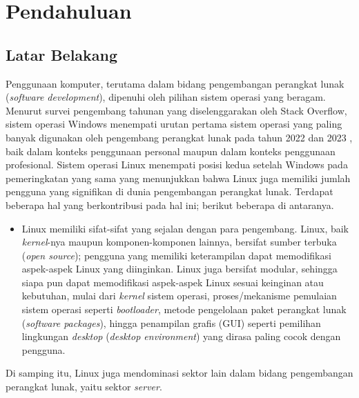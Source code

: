 \chapter{Pendahuluan}

\section{Latar Belakang}

Penggunaan komputer, terutama dalam bidang pengembangan perangkat lunak (\textit{software development}), dipenuhi oleh pilihan sistem operasi yang beragam. Menurut survei pengembang tahunan yang diselenggarakan oleh Stack Overflow, sistem operasi Windows menempati urutan pertama sistem operasi yang paling banyak digunakan oleh pengembang perangkat lunak pada tahun 2022 \cite{stackoverflow-developer-survey-2022-most-popular-os} dan 2023 \cite{stackoverflow-developer-survey-2023-most-popular-os}, baik dalam konteks penggunaan personal maupun dalam konteks penggunaan profesional. Sistem operasi Linux menempati posisi kedua setelah Windows pada pemeringkatan yang sama yang menunjukkan bahwa Linux juga memiliki jumlah pengguna yang signifikan di dunia pengembangan perangkat lunak. Terdapat beberapa hal yang berkontribusi pada hal ini; berikut beberapa di antaranya.
\begin{itemize}
    \item Linux memiliki sifat-sifat yang sejalan dengan para pengembang. Linux, baik \textit{kernel}-nya maupun komponen-komponen lainnya, bersifat sumber terbuka (\textit{open source}); pengguna yang memiliki keterampilan dapat memodifikasi aspek-aspek Linux yang diinginkan. Linux juga bersifat modular, sehingga siapa pun dapat memodifikasi aspek-aspek Linux sesuai keinginan atau kebutuhan, mulai dari \textit{kernel} sistem operasi, proses/mekanisme pemulaian sistem operasi seperti \textit{bootloader}, metode pengelolaan paket perangkat lunak (\textit{software packages}), hingga penampilan grafis (GUI) seperti pemilihan lingkungan \textit{desktop} (\textit{desktop environment}) yang dirasa paling cocok dengan pengguna.
\end{itemize}

Di samping itu, Linux juga mendominasi sektor lain dalam bidang pengembangan perangkat lunak, yaitu sektor \textit{server}.

